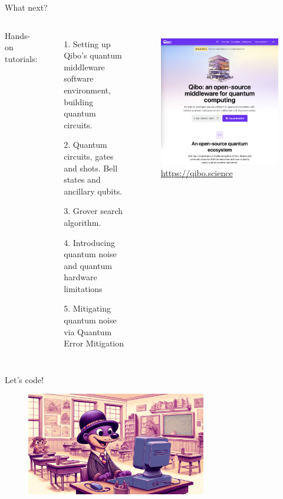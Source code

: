 \documentclass[aspectratio=169, 8pt, xcolor={svgnames}, hyperref={linkcolor=black}]{beamer}
\begin{document}
\begin{frame}{What next?}

  \vspace{0.5cm}
  \begin{columns}
    \column{8cm}
  Hands-on tutorials:
  \begin{enumerate}
    \item[1.] Setting up Qibo’s quantum middleware software environment, building quantum circuits.
    \item[2.] Quantum circuits, gates and shots. Bell states and ancillary qubits.
    \item[3.] Grover search algorithm.
    \item[4.] Introducing quantum noise and quantum hardware limitations
    \item[5.] Mitigating quantum noise via Quantum Error Mitigation
  \end{enumerate}

    \column{5cm}
    \begin{figure}
      \includegraphics[width=\textwidth]{figures/docs.png}
      {\color{blue}\url{https://qibo.science}}
    \end{figure}
  \end{columns}

\end{frame}

\begin{frame}
\centering
\Huge Let's code!
\begin{figure}
   \includegraphics[width=0.7\textwidth]{figures/hands_on.png}
\end{figure}
\end{frame}
\end{document}
